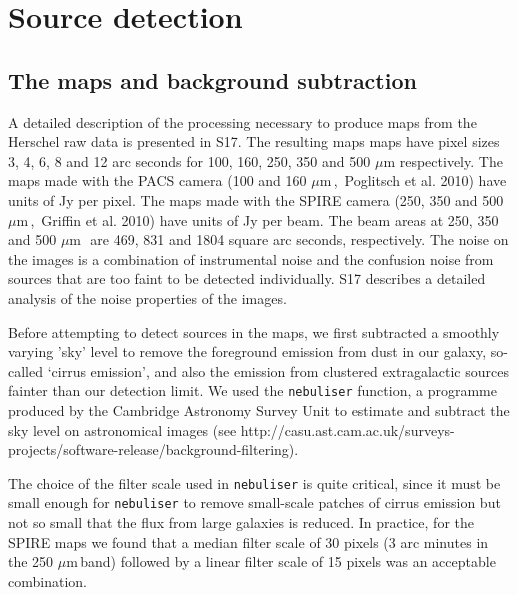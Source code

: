 \documentclass[useAMS,usenatbib]{mnras}
\def\mic{ $\mu $m\,}
\begin{document}
\section{Source detection} 

\subsection{The maps and background subtraction} 

A detailed description of the processing necessary
to produce maps from the
Herschel raw data is presented in S17. The resulting maps maps have
pixel sizes 3, 4, 6, 8 and 12 arc seconds for 100, 160, 250, 350 and
500 $\mu$m respectively. The maps made with the PACS camera
(100 and 160\mic,\ Poglitsch et al. 2010) have units
of Jy per pixel. The maps made with the SPIRE camera
(250, 350 and 500\mic,\ Griffin et al. 2010) have units of Jy per beam.
The beam
areas at 250, 350 and 500\mic\ are 469, 831 and 1804 square arc seconds,
respectively.
The noise on the images is a combination of instrumental noise and the
confusion noise from sources that are too faint to be detected individually.
S17 describes a detailed analysis of the noise properties of the images.

Before attempting to detect sources in the maps, we first subtracted a
smoothly varying 'sky' level to remove the 
foreground emission from dust in our galaxy, so-called `cirrus emission',
and also the emission from
clustered extragalactic sources fainter
than
our detection limit. We
used the {\tt nebuliser} function, a programme produced
by the Cambridge Astronomy Survey Unit to estimate and
subtract the sky level on astronomical images (see
http://casu.ast.cam.ac.uk/surveys-projects/software-release/background-filtering). 

The
choice of the filter scale
used in {\tt nebuliser} is quite critical, since
it  must be small enough for {\tt nebuliser} to remove
small-scale patches of cirrus emission
but not so small that the flux from large galaxies is reduced.
In practice, 
for the SPIRE maps we found that a median filter scale of 30 pixels (3
arc minutes in the 250 \mic band) followed by a linear filter scale of
15 pixels was an acceptable combination. 
\end{document}
